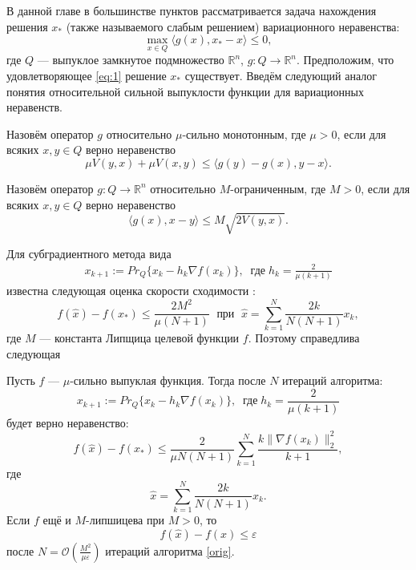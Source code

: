 В данной главе в большинстве пунктов рассматривается задача нахождения решения $x_*$ (также называемого слабым решением) вариационного неравенства: 
\begin{equation}\label{eq:1}
    \max_{x \in Q} \langle g(x), x_* - x \rangle \leq 0,
\end{equation}
где $Q$ --- выпуклое замкнутое подмножество $\mathbb{R}^n$,
$g: Q \longrightarrow \mathbb{R}^n$. Предположим, что удовлетворяющее \eqref{eq:1} решение $x_*$ существует.
Введём следующий аналог понятия относительной сильной выпуклости функции \cite{Lu_Nesterov_2018} для вариационных неравенств.
\begin{definition}\label{DefRelStrongMonot}
    Назовём оператор $g$ относительно $\mu$-сильно монотонным, где $\mu >0$, если для всяких $x, y \in Q$ верно неравенство
        \begin{equation}\label{eq:3}
             \mu V(y, x) + \mu V(x, y) \leq \langle g(y) - g(x), y - x \rangle.
         \end{equation}
\end{definition}
\begin{definition}\label{DefRelBound}\cite{Main}
    Назовём оператор $g: Q \longrightarrow \mathbb{R}^n$ относительно $M$-ограниченным, где $M >0$, если для всяких $x, y \in Q$ верно неравенство
    \begin{equation}\label{rel_bound}
         \langle g(x), x - y \rangle \leq M\sqrt{2V(y,x)}.
     \end{equation}
\end{definition}
\iffalse
    Для субградиентного метода вида
    \begin{gather}\label{orig}
        x_{k+1} := Pr_{Q}\{x_k - h_k \nabla f(x_k) \}, \;\; \textit{где} \; h_k = \frac{2}{\mu (k+1)}
    \end{gather}
    известна следующая оценка скорости сходимости \cite{Bach_2012}:
    \begin{equation}\label{orig_estimation_f}
        f(\widehat{x}) - f(x_*) \leq \frac{2 M^2}{\mu (N+1)}  \; \text{  при   } \; \widehat{x} = \sum\limits_{k=1}^{N} \frac{2 k}{N (N+1)} x_k, 
    \end{equation}
    где $M$ --- константа Липщица целевой функции $f$.
    Поэтому справедлива следующая
    \begin{theorem}\label{ThmBachAdaptive}
        Пусть $f$ --- $\mu$-сильно выпуклая функция. Тогда после $N$ итераций алгоритма:
        $$
            x_{k+1} := Pr_{Q}\{x_k - h_k \nabla f(x_k) \}, \;\; \textit{где} \; h_k = \frac{2}{\mu (k+1)}
        $$
        будет верно неравенство:
        \begin{equation}\label{adaptive_estimation_f}
            f(\widehat{x}) - f(x_*) \leq \frac{2}{\mu N (N+1)} \sum_{k=1}^{N} \frac{k \|\nabla f(x_k)\|_2^2}{k+1},
        \end{equation}
        где
        $$
            \widehat{x} = \sum_{k=1}^{N} \frac{2 k}{N (N+1)} x_k.
        $$
        Если $f$ ещё и $M$-липшицева при $M >0$, то
        $$
             f(\widehat{x}) - f(x) \leq \varepsilon
        $$
        после $N = \mathcal{O}(\frac{M^2}{\mu\varepsilon})$ итераций алгоритма \eqref{orig}.
    \end{theorem}

